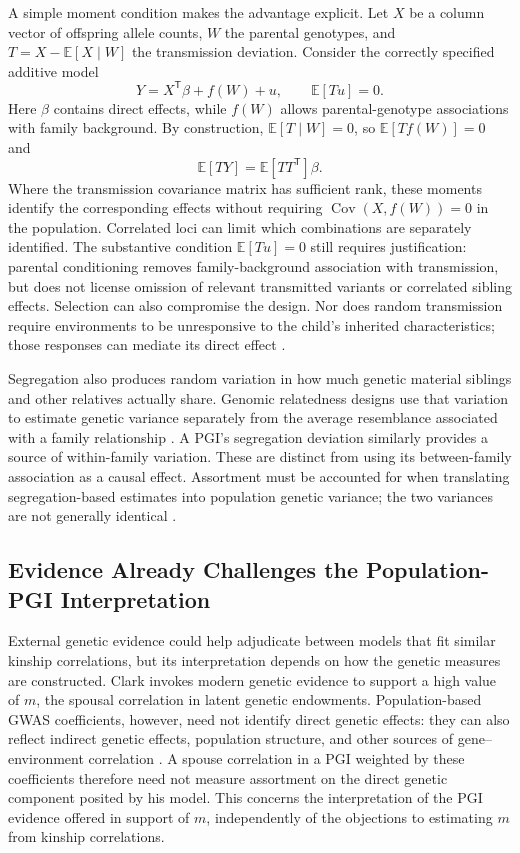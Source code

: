 \documentclass[12pt]{article}
\begin{document}
A simple moment condition makes the advantage explicit. Let $X$ be a column
vector of offspring allele counts, $W$ the parental genotypes, and
$T=X-\mathbb E[X\mid W]$ the transmission deviation. Consider the correctly
specified additive model
\[
 Y=X^{\mathsf T}\beta+f(W)+u,\qquad \mathbb E[T u]=0.
\]
Here $\beta$ contains direct effects, while $f(W)$ allows parental-genotype
associations with family background. By construction,
$\mathbb E[T\mid W]=0$, so $\mathbb E[T f(W)]=0$ and
\[
 \mathbb E[T Y]=\mathbb E[T T^{\mathsf T}]\beta.
\]
Where the transmission covariance matrix has sufficient rank, these
moments identify the corresponding effects without requiring
$\operatorname{Cov}(X,f(W))=0$ in the population. Correlated loci can limit
which combinations are separately identified. The substantive condition
$\mathbb E[T u]=0$ still requires justification: parental conditioning
removes family-background association with transmission, but does not
license omission of relevant transmitted variants or correlated sibling
effects. Selection can also compromise the design. Nor does random
transmission require environments to be unresponsive to the child's
inherited characteristics; those responses can mediate its direct effect
\citep[Sections~3.1, 4.4--4.5]{BenjaminEtAl2026}.

Segregation also produces random variation in how much genetic material
siblings and other relatives actually share. Genomic relatedness designs
use that variation to estimate genetic variance separately from the average
resemblance associated with a family relationship
\citep[Section~4.7]{BenjaminEtAl2026}. A PGI's segregation deviation similarly
provides a source of within-family variation. These are distinct from using
its between-family association as a causal effect. Assortment must be
accounted for when translating segregation-based estimates into population
genetic variance; the two variances are not generally identical
\citep{Young2023}.

\subsection{Evidence Already Challenges the Population-PGI Interpretation}


External genetic evidence could help adjudicate between models that fit
similar kinship correlations, but its interpretation depends on how the
genetic measures are constructed. Clark invokes modern genetic evidence
to support a high value of $m$, the spousal correlation in latent genetic
endowments. Population-based GWAS coefficients, however, need not identify
direct genetic effects: they can also reflect indirect genetic effects,
population structure, and other sources of gene--environment correlation
\citep{YoungEtAl2019,YoungEtAl2022}. A spouse correlation in a PGI weighted
by these coefficients therefore need not measure assortment on the direct
genetic component posited by his model. This concerns the interpretation of
the PGI evidence offered in support of $m$, independently of the objections
to estimating $m$ from kinship correlations.
\end{document}
